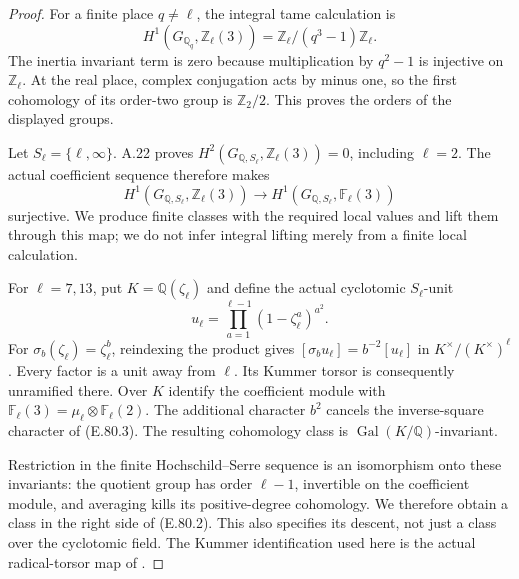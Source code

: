 \begin{proof}
For a finite place $q\ne\ell$, the integral tame calculation is
\[
 H^1(G_{\mathbb Q_q},\mathbb Z_\ell(3))
       =\mathbb Z_\ell/(q^3-1)\mathbb Z_\ell.
\]
The inertia invariant term is zero because multiplication by
$q^2-1$ is injective on $\mathbb Z_\ell$. At the real place,
complex conjugation acts by minus one, so the first cohomology
of its order-two group is $\mathbb Z_2/2$. This proves the
orders of the displayed groups.

Let $S_\ell=\{\ell,\infty\}$. A.22 proves
$H^2(G_{\mathbb Q,S_\ell},\mathbb Z_\ell(3))=0$,
including $\ell=2$. The actual coefficient sequence therefore
makes
\[
 H^1(G_{\mathbb Q,S_\ell},\mathbb Z_\ell(3))
 \longrightarrow H^1(G_{\mathbb Q,S_\ell},\mathbb F_\ell(3))
 \tag{E.80.2}
\]
surjective. We produce finite classes with the required local
values and lift them through this map; we do not infer integral
lifting merely from a finite local calculation.

For $\ell=7,13$, put $K=\mathbb Q(\zeta_\ell)$ and define the
actual cyclotomic $S_\ell$-unit
\[
 u_\ell=\prod_{a=1}^{\ell-1}(1-\zeta_\ell^a)^{a^2}.
 \tag{E.80.3}
\]
For $\sigma_b(\zeta_\ell)=\zeta_\ell^b$, reindexing the
product gives
$[\sigma_bu_\ell]=b^{-2}[u_\ell]$ in
$K^\times/(K^\times)^\ell$. Every factor is a unit away from
$\ell$. Its Kummer torsor is consequently unramified there.
Over $K$ identify the coefficient module with
$\mathbb F_\ell(3)=\mu_\ell\otimes\mathbb F_\ell(2)$.
The additional character $b^2$ cancels the inverse-square
character of (E.80.3). The resulting cohomology class is
$\operatorname{Gal}(K/\mathbb Q)$-invariant.

Restriction in the finite Hochschild--Serre sequence is an
isomorphism onto these invariants: the quotient group has order
$\ell-1$, invertible on the coefficient module, and averaging
kills its positive-degree cohomology. We therefore obtain a
class in the right side of (E.80.2). This also specifies its
descent, not just a class over the cyclotomic field. The Kummer
identification used here is the actual radical-torsor map of
\citet[Theorems 5.30 and 5.32, pp.75--76]{RootMilneFT}.


\end{proof}
